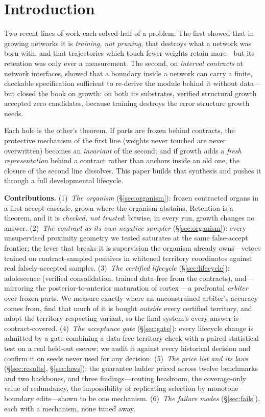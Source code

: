 \documentclass{article}
\begin{document}
\section{Introduction}
Two recent lines of work each solved half of a problem. The first
\citep[our companion developmental study;][]{evci2020rigl,dai2018nest} showed
that in growing networks it is \emph{training, not pruning}, that destroys
what a network was born with, and that trajectories which touch fewer weights
retain more---but its retention was only ever a measurement. The second, on
\emph{interval contracts} at network interfaces, showed that a boundary inside
a network can carry a finite, checkable specification sufficient to re-derive
the module behind it without data---but closed the book on growth: on both its
substrates, verified structural growth accepted zero candidates, because
training destroys the error structure growth needs.

Each hole is the other's theorem. If parts are frozen behind contracts, the
protective mechanism of the first line (weights never touched are never
overwritten) becomes an \emph{invariant} of the second; and if growth adds a
\emph{fresh representation} behind a contract rather than anchors inside an
old one, the closure of the second line dissolves. This paper builds that
synthesis and pushes it through a full developmental lifecycle.

\textbf{Contributions.} (1)~\emph{The organism} (\S\ref{sec:organism}): frozen
contracted organs in a first-accept cascade, grown where the organism
abstains. Retention is a theorem, and it is \emph{checked, not trusted}:
bitwise, in every run, growth changes no answer. (2)~\emph{The contract as its
own negative sampler} (\S\ref{sec:organism}): every unsupervised proximity
geometry we tested saturates at the same false-accept frontier; the lever that
breaks it is supervision the organism already owns---vetoes trained on
contract-sampled positives in whitened territory coordinates against real
falsely-accepted samples. (3)~\emph{The certified lifecycle}
(\S\ref{sec:lifecycle}): adolescence (verified consolidation, trained
data-free from the contracts), and---mirroring the posterior-to-anterior
maturation of cortex \citep{gogtay2004dynamic}---a prefrontal \emph{arbiter}
over frozen parts. We measure exactly where an unconstrained arbiter's
accuracy comes from, find that much of it is bought \emph{outside} every
certified territory, and adopt the territory-respecting variant, so the final
system's every answer is contract-covered. (4)~\emph{The acceptance gate}
(\S\ref{sec:gate}): every lifecycle change is admitted by a gate combining a
data-free territory check with a paired statistical test on a real held-out
escrow; we audit it against every historical decision and confirm it on seeds
never used for any decision. (5)~\emph{The price list and its laws}
(\S\ref{sec:results}, \S\ref{sec:laws}): the guarantee ladder priced across
twelve benchmarks and two backbones, and three findings---routing headroom,
the coverage-only value of redundancy, the impossibility of replicating
selection by monotone boundary edits---shown to be one mechanism.
(6)~\emph{The failure modes} (\S\ref{sec:fails}), each with a mechanism, none
tuned away.
\end{document}
